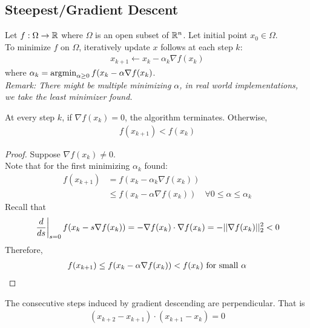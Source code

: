 \documentclass{article}
\begin{document}
	\subsection{Steepest/Gradient Descent}
	\begin{algorithm}
		Let $f: \Omega \to \mathbb{R}$ where $\Omega$ is an open subset of $\mathbb{R}^n$. Let initial point $x_0 \in \Omega$. \\
		To minimize $f$ on $\Omega$, iteratively update $x$ follows at each step $k$:
		\begin{align}
			x_{k+1} \leftarrow x_k - \alpha_k \nabla f(x_k)
		\end{align}
		where $\alpha_k = \operatorname*{argmin}_{\alpha \geq 0} f(x_k - \alpha \nabla f(x_k)$. \\
		\emph{Remark: There might be multiple minimizing $\alpha$, in real world implementations, we take the least minimizer found.}
	\end{algorithm}
	
	\begin{theorem}
		At every step $k$, if $\nabla f(x_k) = 0$, the algorithm terminates. Otherwise,
		\begin{align}
			f(x_{k+1}) < f(x_k)
		\end{align}
	\end{theorem}
	\begin{proof}
		Suppose $\nabla f(x_k) \neq 0$. \\
		Note that for the first minimizing $\alpha_k$ found:
		\begin{align}
			f(x_{k+1}) &= f(x_k - \alpha_k \nabla f(x_k)) \\
			&\leq f(x_k - \alpha \nabla f(x_k))\quad \forall 0 \leq \alpha \leq \alpha_k
		\end{align}
		Recall that
		\begin{align}
			\left. \frac{d}{ds} \right|_{s=0} f(x_k - s\nabla f(x_k)) = - \nabla f(x_k) \cdot \nabla f(x_k) = - \vert \vert {\nabla f(x_k)} \vert \vert_2^2 < 0
		\end{align}
		Therefore,
		\begin{align}
			f(x_{k+1}) \leq f(x_k - \alpha \nabla f(x_k)) < f(x_k) \text{{ for small }}\alpha
		\end{align}
	\end{proof}
	
	\begin{theorem}
		The consecutive steps induced by gradient descending are perpendicular. That is
		\begin{align}
			(x_{k+2} - x_{k+1}) \cdot (x_{k+1} - x_k) = 0
		\end{align}
	\end{theorem}
\end{document}
